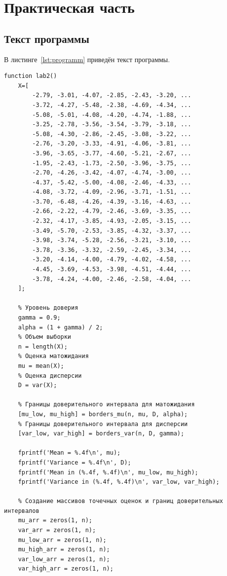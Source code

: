 \chapter{Практическая часть}
\section{Текст программы}
\lstset{language=matlab}

В листинге~\ref{lst:programm} приведён текст программы.
\begin{lstlisting}[caption={Текст программы},label={lst:programm}]
function lab2()
    X=[
        -2.79, -3.01, -4.07, -2.85, -2.43, -3.20, ...
        -3.72, -4.27, -5.48, -2.38, -4.69, -4.34, ...
        -5.08, -5.01, -4.08, -4.20, -4.74, -1.88, ...
        -3.25, -2.78, -3.56, -3.54, -3.79, -3.18, ...
        -5.08, -4.30, -2.86, -2.45, -3.08, -3.22, ...
        -2.76, -3.20, -3.33, -4.91, -4.06, -3.81, ...
        -3.96, -3.65, -3.77, -4.60, -5.21, -2.67, ...
        -1.95, -2.43, -1.73, -2.50, -3.96, -3.75, ...
        -2.70, -4.26, -3.42, -4.07, -4.74, -3.00, ...
        -4.37, -5.42, -5.00, -4.08, -2.46, -4.33, ...
        -4.08, -3.72, -4.09, -2.96, -3.71, -1.51, ...
        -3.70, -6.48, -4.26, -4.39, -3.16, -4.63, ...
        -2.66, -2.22, -4.79, -2.46, -3.69, -3.35, ...
        -2.32, -4.17, -3.85, -4.93, -2.05, -3.15, ...
        -3.49, -5.70, -2.53, -3.85, -4.32, -3.37, ...
        -3.98, -3.74, -5.28, -2.56, -3.21, -3.10, ...
        -3.78, -3.36, -3.32, -2.59, -2.45, -3.34, ...
        -3.20, -4.14, -4.00, -4.79, -4.02, -4.58, ...
        -4.45, -3.69, -4.53, -3.98, -4.51, -4.44, ...
        -3.78, -4.24, -4.00, -2.46, -2.58, -4.04, ...
    ];

    % Уровень доверия
    gamma = 0.9;
    alpha = (1 + gamma) / 2;
    % Объем выборки 
    n = length(X);
    % Оценка матожидания
    mu = mean(X);
    % Оценка дисперсии
    D = var(X);
    
    % Границы доверительного интервала для матожидания
    [mu_low, mu_high] = borders_mu(n, mu, D, alpha);
    % Границы доверительного интервала для дисперсии
    [var_low, var_high] = borders_var(n, D, gamma);
    
    fprintf('Mean = %.4f\n', mu);
    fprintf('Variance = %.4f\n', D);
    fprintf('Mean in (%.4f, %.4f)\n', mu_low, mu_high);
    fprintf('Variance in (%.4f, %.4f)\n', var_low, var_high);
    
    % Создание массивов точечных оценок и границ доверительных интервалов
    mu_arr = zeros(1, n);
    var_arr = zeros(1, n);
    mu_low_arr = zeros(1, n);
    mu_high_arr = zeros(1, n);
    var_low_arr = zeros(1, n);
    var_high_arr = zeros(1, n);
    

\end{lstlisting}

